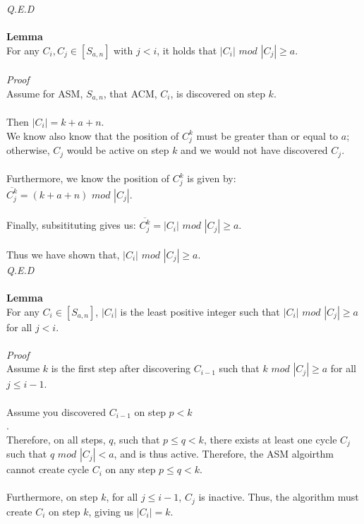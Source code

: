 \documentclass[a4paper,12pt]{article}
\begin{document}
\textit{Q.E.D}\\
\\
\textbf{Lemma}\\
For any $C_i, C_j \in [S_{a,n}]$ with $j < i$, it holds that $|C_i|$ $mod$ $|C_j| \geq a$.\\
\\
\textit{Proof}\\  
Assume for ASM, $S_{a,n}$, that ACM, $C_i$, is discovered on step $k$.\\
\\
Then $|C_i| = k + a + n$.\\
We know also know that the position of $C^k_j$ must be greater than or equal to $a$; otherwise, $C_j$ would be active on step $k$ and we would not have discovered $C_j$.\\
\\
Furthermore, we know the position of $C^k_j$ is given by:\\
$\overline{C^k_j} = (k + a + n)$ $mod$ $|C_j|$.\\ 
\\
Finally, subsitituting gives us: $\overline{C^k_j} = |C_i|$ $mod$ $|C_j| \geq a$.\\
\\
Thus we have shown that, $|C_i|$ $mod$ $|C_j| \geq a$.\\
\textit{Q.E.D}\\ 
\\
\textbf{Lemma}\\
For any $C_i \in [S_{a,n}]$, $|C_i|$ is the least positive integer such that $|C_i|$ $mod$ $|C_j| \geq a$ for all $j < i$.\\
\\
\textit{Proof}\\
Assume $k$ is the first step after discovering $C_{i-1}$ such that $k$ $mod$ $|C_{j}| \geq a$ for all $j \leq i-1$.\\
\\ 
Assume you discovered $C_{i-1}$ on step $p < k$\\.
\\
Therefore, on all steps, $q$, such that $p \leq q < k$, there exists at least one cycle $C_j$ such that $q$ $mod$ $|C_j| < a$, and is thus active. Therefore, the ASM algoirthm cannot create cycle $C_i$ on any step $p \leq q < k$.\\
\\
Furthermore, on step $k$, for all $j \leq i-1$, $C_j$ is inactive. Thus, the algorithm must create $C_i$ on step $k$, giving us $|C_i| = k$.\\
\end{document}

